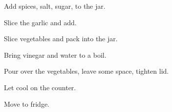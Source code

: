 \begin{preparation}
\item Add spices, salt, sugar, to the jar.
\item Slice the garlic and add.
\item Slice vegetables and pack into the jar.
\item Bring vinegar and water to a boil.
\item Pour over the vegetables, leave some space, tighten lid.
\item Let cool on the counter.
\item Move to fridge.
\end{preparation}

\recipeend%
